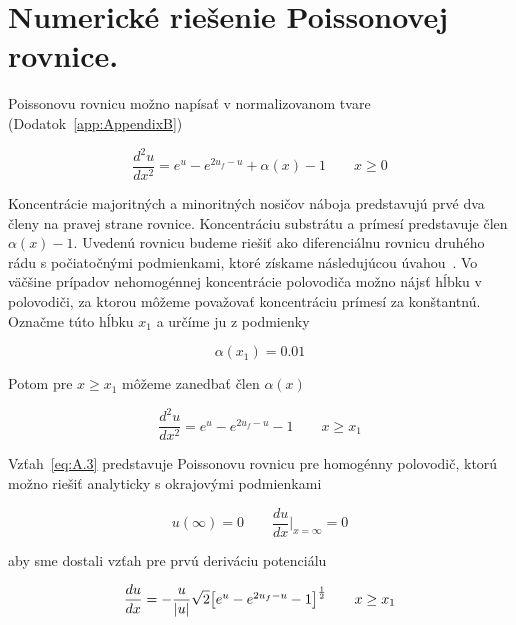 
\chapter{Numerické riešenie Poissonovej rovnice.}\label{app:AppendixA}
\raggedright{}

Poissonovu rovnicu možno napísať v normalizovanom tvare
(Dodatok~\ref{app:AppendixB})

\begin{equation}\label{eq:A.1}
  \frac{d^2u}{dx^2} = e^u - e^{2u_f-u} + \alpha(x) - 1 \qquad {x\ge0}
\end{equation}

 Koncentrácie majoritných a minoritných nosičov náboja predstavujú
 prvé dva členy na pravej strane rovnice. Koncentráciu substrátu a
 prímesí predstavuje člen $\alpha(x)-1$. Uvedenú rovnicu budeme riešiť
 ako diferenciálnu rovnicu druhého rádu s počiatočnými podmienkami,
 ktoré získame následujúcou úvahou~\cite{App.1}. Vo väčšine prípadov
 nehomogénnej koncentrácie polovodiča možno nájsť hĺbku v polovodiči,
 za ktorou môžeme považovať koncentráciu prímesí za
 konštantnú. Označme túto hĺbku $x_1$ a určíme ju z podmienky

\begin{equation}\label{eq:A.2}
  \alpha(x_1)  =  0.01
\end{equation}

Potom pre $x\ge{x_1}$ môžeme zanedbať člen $\alpha(x)$

\begin{equation}\label{eq:A.3}
  \frac{d^2u}{dx^2} = e^u - e^{2u_f-u} - 1 \qquad {x\ge{x_1}}
\end{equation}

Vzťah~\ref{eq:A.3} predstavuje Poissonovu rovnicu pre homogénny
polovodič, ktorú možno riešiť analyticky s okrajovými podmienkami

\begin{equation}\label{eq:A.4}
  u(\infty) = 0 \qquad \frac{du}{dx}\Big\rvert_{x=\infty} = 0
\end{equation}

aby sme dostali vzťah pre prvú deriváciu potenciálu

\begin{equation}\label{eq:A.5}
  \frac{du}{dx} = - \frac{u}{|u|} \sqrt{2} \big{[e^u - e^{2u_f-u} - 1 \big]}^{\frac{1}{2}} \qquad {x\ge{x_1}}
\end{equation}


